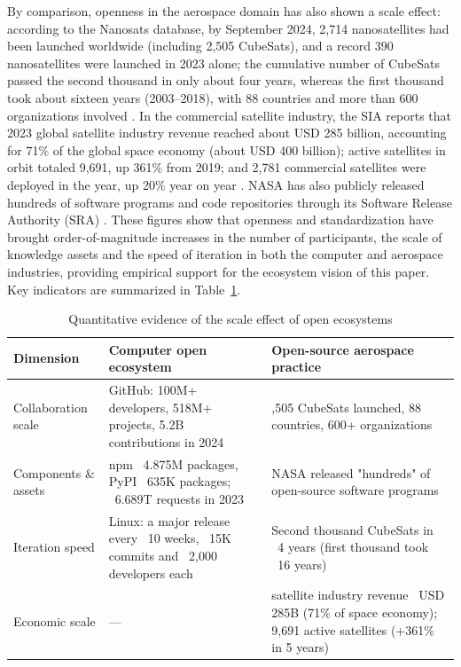 \documentclass[11pt]{article}
\begin{document}
By comparison, openness in the aerospace domain has also shown a scale effect: according to the Nanosats database, by September 2024, 2,714 nanosatellites had been launched worldwide (including 2,505 CubeSats), and a record 390 nanosatellites were launched in 2023 alone; the cumulative number of CubeSats passed the second thousand in only about four years, whereas the first thousand took about sixteen years (2003--2018), with 88 countries and more than 600 organizations involved \cite{kulu2024}. In the commercial satellite industry, the SIA reports that 2023 global satellite industry revenue reached about USD 285 billion, accounting for 71\% of the global space economy (about USD 400 billion); active satellites in orbit totaled 9,691, up 361\% from 2019; and 2,781 commercial satellites were deployed in the year, up 20\% year on year \cite{sia2024}. NASA has also publicly released hundreds of software programs and code repositories through its Software Release Authority (SRA) \cite{nasa}. These figures show that openness and standardization have brought order-of-magnitude increases in the number of participants, the scale of knowledge assets and the speed of iteration in both the computer and aerospace industries, providing empirical support for the ecosystem vision of this paper. Key indicators are summarized in Table~\ref{tab:data}.

\begin{table}
\centering
\caption{Quantitative evidence of the scale effect of open ecosystems}
\label{tab:data}
\begin{tabularx}{\linewidth}{@{}>{\raggedright\arraybackslash}p{2.6cm}>{\raggedright\arraybackslash}X>{\raggedright\arraybackslash}X@{}}
\toprule
Dimension & Computer open ecosystem & Open-source aerospace practice \\
\midrule
Collaboration scale & GitHub: 100M+ developers, 518M+ projects, 5.2B contributions in 2024 \cite{octoverse2024} & 2,505 CubeSats launched, 88 countries, 600+ organizations \cite{kulu2024} \\
Components \& assets & npm ~4.875M packages, PyPI ~635K packages; ~6.689T requests in 2023 \cite{sonatype2024} & NASA released "hundreds" of open-source software programs \cite{nasa} \\
Iteration speed & Linux: a major release every ~10 weeks, ~15K commits and ~2,000 developers each \cite{lwn2023} & Second thousand CubeSats in ~4 years (first thousand took ~16 years) \cite{kulu2024} \\
Economic scale & --- & 2023 satellite industry revenue ~USD 285B (71\% of space economy); 9,691 active satellites (+361\% in 5 years) \cite{sia2024} \\
\bottomrule
\end{tabularx}
\end{table}
\end{document}
